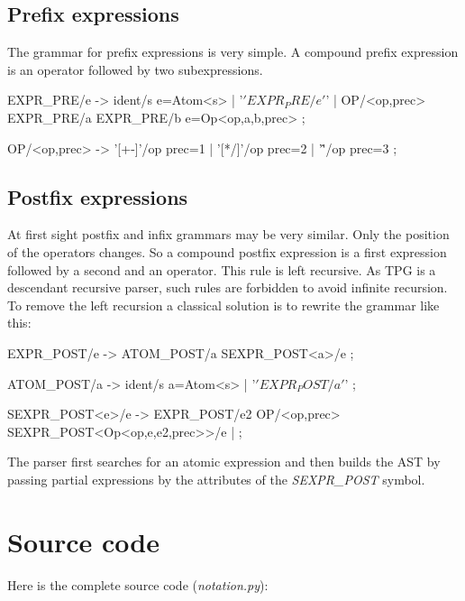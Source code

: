 \subsection{Prefix expressions}

The grammar for prefix expressions is very simple.
A compound prefix expression is an operator followed by two subexpressions.

\begin{verbatimtab}[4]
EXPR_PRE/e ->
	ident/s e=Atom<s>
|	'\(' EXPR_PRE/e '\)'
|	OP/<op,prec> EXPR_PRE/a EXPR_PRE/b e=Op<op,a,b,prec>
;

OP/<op,prec> ->
	'[+-]'/op prec=1
|	'[*/]'/op prec=2
|	'\^'/op   prec=3
;
\end{verbatimtab}

\subsection{Postfix expressions}

At first sight postfix and infix grammars may be very similar.
Only the position of the operators changes.
So a compound postfix expression is a first expression followed by a second and an operator.
This rule is left recursive.
As TPG is a descendant recursive parser, such rules are forbidden to avoid infinite recursion.
To remove the left recursion a classical solution is to rewrite the grammar like this:

\begin{verbatimtab}[4]
EXPR_POST/e -> ATOM_POST/a SEXPR_POST<a>/e ;

ATOM_POST/a ->
	ident/s a=Atom<s>
|	'\(' EXPR_POST/a '\)'
;

SEXPR_POST<e>/e ->
	EXPR_POST/e2 OP/<op,prec> SEXPR_POST<Op<op,e,e2,prec>>/e
|	;
\end{verbatimtab}

The parser first searches for an atomic expression and then builds the AST by passing partial expressions by the attributes of the \emph{SEXPR\_POST} symbol.

\section{Source code}

Here is the complete source code (\emph{notation.py}):

